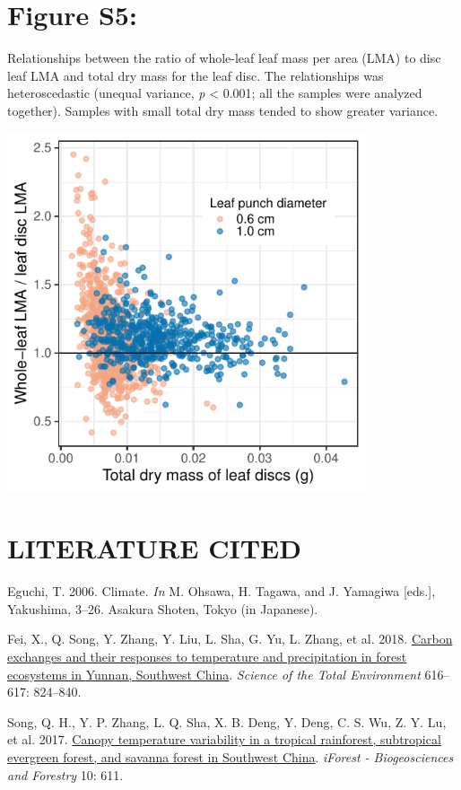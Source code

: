 \documentclass[
  12pt,
]{article}
\newlength{\cslhangindent}
\newlength{\cslentryspacingunit} %
\newenvironment{CSLReferences}[2] %
 {%
  \setlength{\parindent}{0pt}
  \ifodd #1
  \let\oldpar\par
  \def\par{\hangindent=\cslhangindent\oldpar}
  \fi
  \setlength{\parskip}{#2\cslentryspacingunit}
 }%
 {}
\begin{document}
\newpage

\hypertarget{figure-s5}{%
\section{Figure S5:}\label{figure-s5}}

Relationships between the ratio of whole-leaf leaf mass per area (LMA) to disc leaf LMA and total dry mass for the leaf disc.
The relationships was heteroscedastic (unequal variance, \emph{p} \textless{} 0.001; all the samples were analyzed together).
Samples with small total dry mass tended to show greater variance.

\includegraphics[width=4.16667in,height=\textheight]{../figs/ratio_dm.pdf}

\newpage

\hypertarget{literature-cited}{%
\section*{LITERATURE CITED}\label{literature-cited}}

\hypertarget{refs}{}
\begin{CSLReferences}{1}{0}
\leavevmode{}%
Eguchi, T. 2006. Climate. \emph{In} M. Ohsawa, H. Tagawa, and J. Yamagiwa {[}eds.{]}, Yakushima, 3--26. {Asakura Shoten}, {Tokyo (in Japanese)}.

\leavevmode{}%
Fei, X., Q. Song, Y. Zhang, Y. Liu, L. Sha, G. Yu, L. Zhang, et al. 2018. \href{https://doi.org/10.1016/j.scitotenv.2017.10.239}{Carbon exchanges and their responses to temperature and precipitation in forest ecosystems in {Yunnan}, {Southwest China}}. \emph{Science of the Total Environment} 616--617: 824--840.

\leavevmode{}%
Song, Q. H., Y. P. Zhang, L. Q. Sha, X. B. Deng, Y. Deng, C. S. Wu, Z. Y. Lu, et al. 2017. \href{https://doi.org/10.3832/ifor2223-010}{Canopy temperature variability in a tropical rainforest, subtropical evergreen forest, and savanna forest in {Southwest China}}. \emph{iForest - Biogeosciences and Forestry} 10: 611.

\end{CSLReferences}
\end{document}
